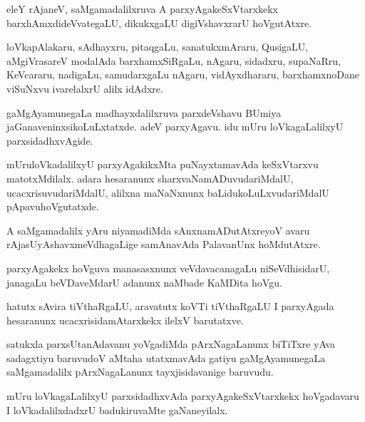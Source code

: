 \documentclass{article}
\begin{document}
\begin{mn}
eleY rAjaneV, saMgamadalilxruva A parxyAgakeSxVtarxkekx barxhAmxdideVvategaLU, dikukxgaLU
digiVshavxrarU hoVgutAtxre.
\end{mn}

\begin{mn}
loVkapAlakaru, sAdhayxru, pitaqgaLu, sanatukxmAraru, QusigaLU, aMgiVrasareV modalAda 
barxhamxSiRgaLu, nAgaru, sidadxru, supaNaRru, KeVcararu, nadigaLu, samudarxgaLu nAgaru, 
vidAyxdhararu, barxhamxnoDane viSuNxvu ivarelalxrU alilx idAdxre.
\end{mn}

\begin{mn}
gaMgAyamunegaLa madhayxdalilxruva parxdeVshavu BUmiya jaGanaveninxsikoLuLxtatxde. adeV 
parxyAgavu. idu mUru loVkagaLalilxyU parxsidadhxvAgide.
\end{mn}

\begin{mn}
mUruloVkadalilxyU parxyAgakikxMta puNayxtamavAda keSxVtarxvu matotxMdilalx. adara hesaranunx 
sharxvaNamADuvudariMdalU, ucacxrisuvudariMdalU, alilxna maNaNxnunx baLidukoLuLxvudariMdalU 
pApavuhoVgutatxde.
\end{mn}

\begin{mn}
A saMgamadalilx yAru niyamadiMda sAnxnamADutAtxreyoV avaru rAjasUyAshavxmeVdhagaLige samAnavAda 
PalavanUnx hoMdutAtxre.
\end{mn}

\begin{mn}
parxyAgakekx hoVguva manasasxnunx veVdavacanagaLu niSeVdhisidarU, janagaLu beVDaveMdarU 
adanunx naMbade KaMDita hoVgu.
\end{mn}

\begin{mn}
hatutx sAvira tiVthaRgaLU, aravatutx koVTi tiVthaRgaLU I parxyAgada hesaranunx 
ucacxrisidamAtarxkekx ilelxV barutatxve.
\end{mn}

\begin{mn}
satukxla parxsUtanAdavanu yoVgadiMda pArxNagaLanunx biTiTxre yAva sadagxtiyu baruvudoV aMtaha 
utatxmavAda gatiyu gaMgAyamunegaLa saMgamadalilx pArxNagaLanunx tayxjisidavanige baruvudu.
\end{mn}

\begin{mn}
mUru loVkagaLalilxyU parxsidadhxvAda parxyAgakeSxVtarxkekx hoVgadavaru I loVkadalilxdadxrU 
badukiruvaMte gaNaneyilalx.
\end{mn}
\end{document}

